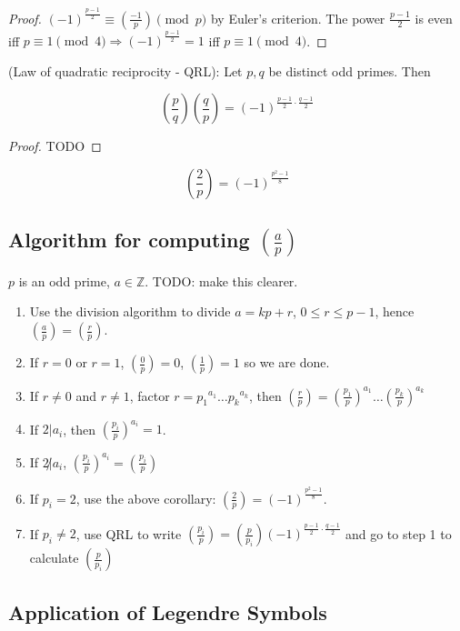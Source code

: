 \begin{proof}
	$(-1)^{\frac{p - 1}{2}} \equiv (\frac{-1}{p}) \pmod{p}$ by Euler's criterion.
	The power $\frac{p - 1}{2}$ is even iff $p \equiv 1 \pmod{4} \Rightarrow (-1)^{\frac{p - 1}{2}} = 1$ iff $p \equiv 1 \pmod{4}$.
\end{proof}

\begin{theorem}
	(Law of quadratic reciprocity - QRL): Let $p, q$ be distinct odd primes. Then
	
	\[(\frac{p}{q}) (\frac{q}{p}) = (-1)^{\frac{p - 1}{2} \cdot \frac{q - 1}{2}}\]
\end{theorem}

\begin{proof}
	TODO
\end{proof}

\begin{corollary}
	\[(\frac{2}{p}) = (-1)^{\frac{p^2 - 1}{8}}\]
\end{corollary}

\subsection{Algorithm for computing $(\frac{a}{p})$}

$p$ is an odd prime, $a \in \mathbb{Z}$. TODO: make this clearer.

\begin{enumerate}
	\item Use the division algorithm to divide $a = kp + r$, $0 \le r \le p - 1$, hence $(\frac{a}{p}) = (\frac{r}{p})$.
	\item If $r = 0$ or $r = 1$, $(\frac{0}{p}) = 0$, $(\frac{1}{p}) = 1$ so we are done.
	\item If $r \ne 0$ and $r \ne 1$, factor $r = {p_1}^{a_1} \dots {p_k}^{a_k}$, then $(\frac{r}{p}) = (\frac{p_1}{p})^{a_1} \dots (\frac{p_k}{p})^{a_k}$
	\item If $2 | a_i$, then $(\frac{p_i}{p})^{a_i} = 1$.
	\item If $2 \not | a_i$, $(\frac{p_i}{p})^{a_i} = (\frac{p_i}{p})$
	\item If $p_i = 2$, use the above corollary: $(\frac{2}{p}) = (-1)^{\frac{p^2 - 1}{8}}$.
	\item If $p_i \ne 2$, use QRL to write $(\frac{p_i}{p}) = (\frac{p}{p_i}) (-1)^{\frac{p - 1}{2} \cdot \frac{q - 1}{2}}$ and go to step 1 to calculate $(\frac{p}{p_i})$
\end{enumerate}

\subsection{Application of Legendre Symbols}

